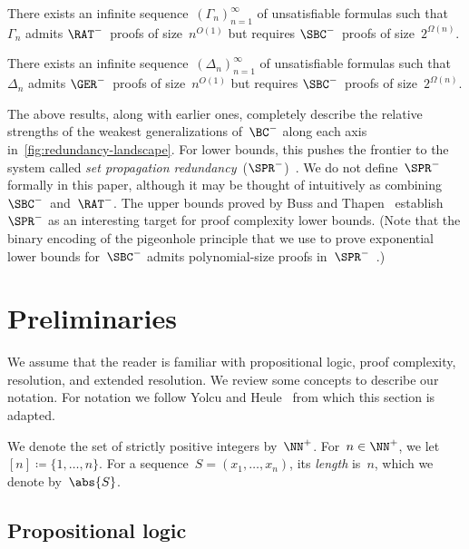 \documentclass[12pt]{article}
\begin{document}
\begin{theorem}\label{thm:RAT-from-SBC}
  There exists an infinite sequence~$(\Gamma_n)_{n = 1}^\infty$ of unsatisfiable formulas
  such that $\Gamma_n$ admits $\RAT^-$~proofs of size~$n^{O(1)}$
  but requires $\SBC^-$~proofs of size~$2^{\Omega(n)}$.
\end{theorem}

\begin{theorem}\label{thm:GER-from-SBC}
  There exists an infinite sequence~$(\Delta_n)_{n = 1}^\infty$ of unsatisfiable formulas
  such that $\Delta_n$ admits $\GER^-$~proofs of size~$n^{O(1)}$
  but requires $\SBC^-$~proofs of size~$2^{\Omega(n)}$.
\end{theorem}

The above results, along with earlier ones,
completely describe the relative strengths
of the weakest generalizations of~$\BC^-$
along each axis in~\cref{fig:redundancy-landscape}.
For lower bounds, this pushes the frontier
to the system called \emph{set propagation redundancy}~($\SPR^-$)~\cite{HKB20}.
We do not define~$\SPR^-$ formally in this paper,
although it may be thought of intuitively
as combining $\SBC^-$~and~$\RAT^-$.
The upper bounds proved by Buss and Thapen~\cite{BT21}
establish~$\SPR^-$ as an interesting target
for proof complexity lower bounds.
(Note that the binary encoding of the pigeonhole principle
that we use to prove exponential lower bounds for~$\SBC^-$
admits polynomial-size proofs in~$\SPR^-$~\cite[Theorem~4.4]{BT21}.)

\section{Preliminaries}
\label{sec:preliminaries}

We assume that the reader is familiar with propositional logic,
proof complexity, resolution, and extended resolution.
We review some concepts to describe our notation.
For notation we follow Yolcu and Heule~\cite{YH23} from which this section is adapted.

We denote the set of strictly positive integers by~$\NN^+$.
For~$n \in \NN^+$, we let $[n] \coloneqq \{1, \dots, n\}$.
For a sequence~$S = (x_1, \dots, x_n)$,
its \emph{length} is~$n$, which we denote by~$\abs{S}$.

\subsection{Propositional logic}
\label{sec:propositional-logic}
\end{document}
